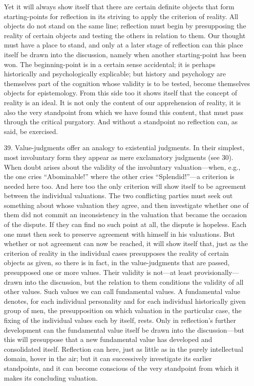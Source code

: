 \documentclass[12pt,a4paper]{book}
\newcommand{\opage}[1]{\marginnote{\footnotesize\textit{[#1]}}}
\begin{document}
Yet it will always show itself that there are certain definite objects
that form starting-points for reflection in its striving to apply the
criterion of reality. All objects do not stand on the same line; reflection
must begin by presupposing the reality of certain objects and testing the
others in relation to them. \opage{107}Our thought must have a place to stand, and
only at a later stage of reflection can this place itself be drawn into the
discussion, namely when another starting-point has been won. The
beginning-point is in a certain sense accidental; it is perhaps
historically and psychologically explicable; but history and psychology are
themselves part of the cognition whose validity is to be tested, become
themselves objects for epistemology. From this side too it shows itself
that the concept of reality is an ideal. It is not only the content of our
apprehension of reality, it is also the very standpoint from which we have
found this content, that must pass through the critical purgatory. And
without a standpoint no reflection can, as said, be exercised.

39. Value-judgments offer an analogy to existential judgments. In their
simplest, most involuntary form they appear as mere exclamatory judgments
(see 30). When doubt arises about the validity of the involuntary
valuation---when, e.g., the one cries ``Abominable!'' where the other cries
``Splendid!''---a criterion is needed here too. And here too the only
criterion will show itself to be agreement between the individual
valuations. The two conflicting parties must seek out something about whose
valuation they agree, and then investigate whether one of them did not
commit an inconsistency in the valuation that became the occasion of the
dispute. If they can find no such point at all, the dispute is hopeless.
Each one must then seek to preserve agreement with himself in his
valuations. But whether or not agreement can now be reached, it will show
itself that, just as the criterion of reality in the individual cases
presupposes the reality of certain objects as given, so there is in fact,
in the value-judgments that are passed, presupposed one or more values.
Their validity is not---at least provisionally---drawn into the discussion,
but the relation to them conditions the validity of all other values. Such
values we can call fundamental values. A fundamental value denotes, for
each individual personality and for each individual historically given
group of men, the presupposition on which valuation in the \opage{108}particular
case, the fixing of the individual values each by itself, rests. Only in
reflection's further development can the fundamental value itself be drawn
into the discussion---but this will presuppose that a new fundamental value
has developed and consolidated itself. Reflection can here, just as little
as in the purely intellectual domain, hover in the air; but it can
successively investigate its earlier standpoints, and it can become
conscious of the very standpoint from which it makes its concluding
valuation.
\end{document}

